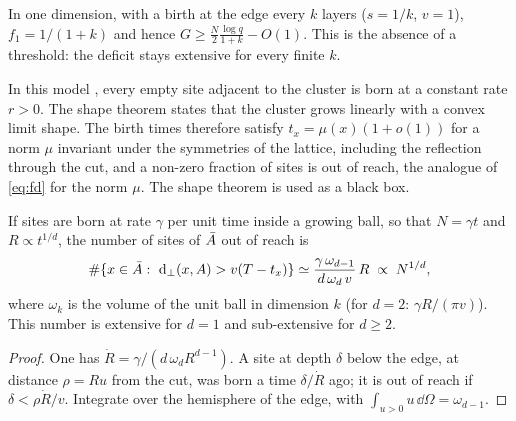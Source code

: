 In one dimension, with a birth at the edge every $k$ layers ($s=1/k$, $v=1$), $f_1=1/(1+k)$ and hence $G\ge\frac{N}{2}\frac{\log q}{1+k}-O(1)$. This is the absence of a threshold: the deficit stays extensive for every finite $k$.

\begin{remark}\label{rem:eden}
In this model \cite{Eden1961,Richardson1973}, every empty site adjacent to the cluster is born at a constant rate $r>0$. The shape theorem \cite{Richardson1973,CoxDurrett1981} states that the cluster grows linearly with a convex limit shape. The birth times therefore satisfy $t_x=\mu(x)(1+o(1))$ for a norm $\mu$ invariant under the symmetries of the lattice, including the reflection through the cut, and a non-zero fraction of sites is out of reach, the analogue of \eqref{eq:fd} for the norm $\mu$. The shape theorem is used as a black box.
\end{remark}

\begin{proposition}\label{prop:rate}
If sites are born at rate $\gamma$ per unit time inside a growing ball, so that $N=\gamma t$ and $R\propto t^{1/d}$, the number of sites of $\bar A$ out of reach is
\begin{equation}\label{eq:rate}
\#\{x\in\bar A:\ \mathrm d_\perp(x,A)>v(T-t_x)\}\simeq\frac{\gamma\,\omega_{d-1}}{d\,\omega_d\,v}\,R\;\propto\;N^{1/d},
\end{equation}
where $\omega_k$ is the volume of the unit ball in dimension $k$ (for $d=2$: $\gamma R/(\pi v)$). This number is extensive for $d=1$ and sub-extensive for $d\ge2$.
\end{proposition}
\begin{proof}
One has $\dot R=\gamma/(d\,\omega_dR^{d-1})$. A site at depth $\delta$ below the edge, at distance $\rho=Ru$ from the cut, was born a time $\delta/\dot R$ ago; it is out of reach if $\delta<\rho\dot R/v$. Integrate over the hemisphere of the edge, with $\int_{u>0}u\,\dd\Omega=\omega_{d-1}$.
\end{proof}


